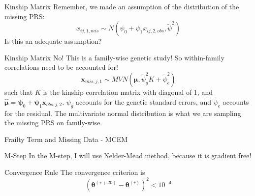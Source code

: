 \documentclass [aspectratio=169]{beamer}
\begin{document}
\begin{frame}{Kinship Matrix}
    Remember, we made an assumption of the distribution of the missing PRS:
    \begin{equation} 
        x_{ij,1,mis}\sim N(\psi_0+\psi_1x_{ij,2,obs}, \tilde{\psi}^2) 
    \end{equation} 
    Is this an adequate assumption? 
\end{frame}

\begin{frame}{Kinship Matrix}
    No! This is a family-wise genetic study! So within-family correlations need to be accounted for! 
    \begin{equation}
        \mathbf{x}_{mis,j,1}\sim MVN(\boldsymbol{\mu}, \tilde{\psi}_g^2K+\tilde{\psi}_e^2)
    \end{equation}
    such that $K$ is the kinship correlation matrix with diagonal of 1, and $\hat{\boldsymbol{\mu}}=\boldsymbol{\psi}_0+\boldsymbol{\psi}_1 \mathbf{x}_{obs,j,2}$. 
    $\tilde{\psi}_g$ accounts for the genetic standard errors, and $\tilde{\psi}_e$ accounts for the residual. 
    The multivariate normal distribution is what we are sampling the missing PRS on family-wise. 
\end{frame}

\begin{frame}{Frailty Term and Missing Data - MCEM} 
    \begin{block}{M-Step}
        In the M-step, I will use Nelder-Mead method, because it is gradient free! 
    \end{block}
    \begin{block}{Convergence Rule}
        The convergence criterion is 
        \begin{equation} 
            (\boldsymbol{\theta}^{(r+20)}-\boldsymbol{\theta}^{(r)})^2 < 10^{-4}
        \end{equation}
    \end{block}
\end{frame}
\end{document}
